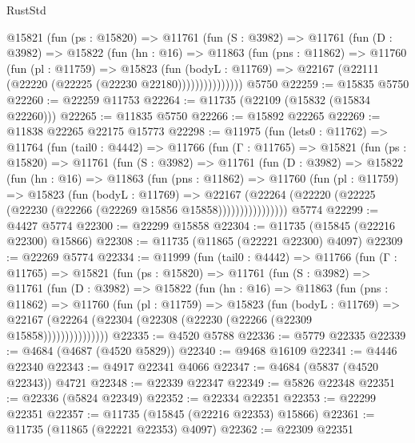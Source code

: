 \begin{lexlean}{RustStd}
\begin{coremodule}
          @15821
            (fun (ps : @15820) =>
            @11761
              (fun (S : @3982) =>
              @11761
                (fun (D : @3982) =>
                @15822
                  (fun (hn : @16) =>
                  @11863
                    (fun (pns : @11862) =>
                    @11760
                      (fun (pl : @11759) =>
                      @15823
                        (fun (bodyL : @11769) =>
                        @22167 (@22111 (@22220 (@22225 (@22230 @22180)))))))))))))))
    @5750
@22259 := @15835 @5750
@22260 := @22259 @11753
@22264 := @11735 (@22109 (@15832 (@15834 @22260)))
@22265 := @11835 @5750
@22266 := @15892 @22265
@22269 := @11838 @22265 @22175 @15773
@22298 := @11975
    (fun (lets0 : @11762) =>
    @11764
      (fun (tail0 : @4442) =>
      @11766
        (fun (Γ : @11765) =>
        @15821
          (fun (ps : @15820) =>
          @11761
            (fun (S : @3982) =>
            @11761
              (fun (D : @3982) =>
              @15822
                (fun (hn : @16) =>
                @11863
                  (fun (pns : @11862) =>
                  @11760
                    (fun (pl : @11759) =>
                    @15823
                      (fun (bodyL : @11769) =>
                      @22167
                        (@22264
                          (@22220 (@22225 (@22230 (@22266 (@22269 @15856 @15858))))))))))))))))
    @5774
@22299 := @4427 @5774
@22300 := @22299 @15858
@22304 := @11735 (@15845 (@22216 @22300) @15866)
@22308 := @11735 (@11865 (@22221 @22300) @4097)
@22309 := @22269 @5774
@22334 := @11999
    (fun (tail0 : @4442) =>
    @11766
      (fun (Γ : @11765) =>
      @15821
        (fun (ps : @15820) =>
        @11761
          (fun (S : @3982) =>
          @11761
            (fun (D : @3982) =>
            @15822
              (fun (hn : @16) =>
              @11863
                (fun (pns : @11862) =>
                @11760
                  (fun (pl : @11759) =>
                  @15823
                    (fun (bodyL : @11769) =>
                    @22167 (@22264 (@22304 (@22308 (@22230 (@22266 (@22309 @15858)))))))))))))))
@22335 := @4520 @5788
@22336 := @5779 @22335
@22339 := @4684 (@4687 (@4520 @5829))
@22340 := @9468 @16109
@22341 := @4446 @22340
@22343 := @4917 @22341 @4066
@22347 := @4684 (@5837 (@4520 @22343)) @4721
@22348 := @22339 @22347
@22349 := @5826 @22348
@22351 := @22336 (@5824 @22349)
@22352 := @22334 @22351
@22353 := @22299 @22351
@22357 := @11735 (@15845 (@22216 @22353) @15866)
@22361 := @11735 (@11865 (@22221 @22353) @4097)
@22362 := @22309 @22351

\end{coremodule}
\end{lexlean}
